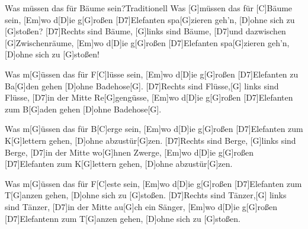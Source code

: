 \documentclass[../main.tex]{subfiles}
\begin{document}
\begin{song}{Was müssen das für Bäume sein?}{Traditionell}{}
Was [G]müssen das für [C]Bäume sein,
[Em]wo d[D]ie g[G]roßen [D7]Elefanten spa[G]zieren geh’n,
[D]ohne sich zu [G]stoßen?
[D7]Rechts sind Bäume, [G]links sind Bäume,
[D7]und dazwischen [G]Zwischenräume,
[Em]wo d[D]ie g[G]roßen [D7]Elefanten spa[G]zieren geh’n,
[D]ohne sich zu [G]stoßen!

Was m[G]{ü}ssen das für F[C]lüsse sein,
[Em]wo d[D]ie g[G]roßen [D7]Elefanten zu Ba[G]den gehen
[D]ohne Badehose[G].
[D7]Rechts sind Flüsse,[G] links sind Flüsse,
[D7]in der Mitte Re[G]gengüsse,
[Em]wo d[D]ie g[G]roßen [D7]Elefanten zum B[G]aden gehen
[D]ohne Badehose[G].

Was m[G]{ü}ssen das für B[C]erge sein,
[Em]wo d[D]ie g[G]roßen [D7]Elefanten zum K[G]lettern gehen,
[D]ohne abzustür[G]zen.
[D7]Rechts sind Berge, [G]links sind Berge,
[D7]in der Mitte wo[G]hnen Zwerge,
[Em]wo d[D]ie g[G]roßen [D7]Elefanten zum K[G]lettern gehen,
[D]ohne abzustür[G]zen.

Was m[G]{ü}ssen das für F[C]este sein,
[Em]wo d[D]ie g[G]roßen [D7]Elefanten zum T[G]anzen gehen,
[D]ohne sich zu [G]stoßen.
[D7]Rechts sind Tänzer,[G] links sind Tänzer,
[D7]in der Mitte au[G]ch ein Sänger,
[Em]wo d[D]ie g[G]roßen [D7]Elefantenn zum T[G]anzen gehen,
[D]ohne sich zu [G]stoßen.

\end{song}
\end{document}

